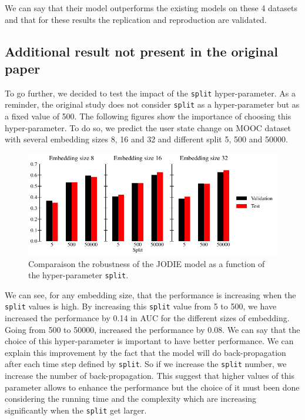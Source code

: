 We can say that their model outperforms the existing models on these 4 datasets and that for these results the replication and reproduction are validated.

\subsection*{Additional result not present in the original paper}

To go further, we decided to test the impact of the \texttt{split} hyper-parameter. As a reminder, the original study does not consider \texttt{split} as a hyper-parameter but as a fixed value of 500. The following figures show the importance of choosing this hyper-parameter. To do so, we predict the user state change on MOOC dataset with several embedding sizes 8, 16 and 32 and different split 5, 500 and 50000.

\begin{figure}[H]
    \centering
    \includegraphics[width = \textwidth]{image/split.pdf}
    \caption{Comparaison the robustness of the JODIE model as a function of the hyper-parameter \texttt{split}.}
    \label{fig:foobar}
\end{figure}

We can see, for any embedding size, that the performance is increasing when the \texttt{split} values is high. By increasing this \texttt{split} value from 5 to 500, we have increased the performance by 0.14 in AUC for the different sizes of embedding. Going from 500 to 50000, increased the performance by 0.08. We can say that the choice of this hyper-parameter is important to have better performance. We can explain this improvement by the fact that the model will do back-propagation after each time step defined by \texttt{split}. So if we increase the \texttt{split} number, we increase the number of back-propagation. This suggest that higher values of this parameter allows to enhance the performance but the choice of it must been done considering the running time and the complexity which are increasing significantly when the \texttt{split} get larger.

